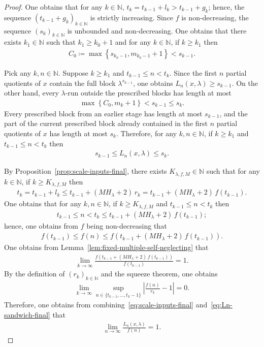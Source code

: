 \documentclass[12pt,reqno]{amsart}
\theoremstyle{definition}
\theoremstyle{plain}
\begin{document}
\begin{proof}
One obtains that for any $k\in\mathbb{N}$, $t_k=t_{k-1}+l_k>t_{k-1}+g_k$; hence, the sequence $(t_{k-1}+g_k)_{k\in\mathbb{N}}$ is strictly increasing. Since $f$ is non-decreasing, the sequence $(s_k)_{k\in\mathbb{N}}$ is unbounded and non-decreasing. One obtains that there exists $k_1\in\mathbb{N}$ such that $k_1\geq k_0+1$ and for any $k\in\mathbb{N}$, if $k\geq k_1$ then
\begin{align*}
    C_0\coloneqq\max{\left\{s_{k_0-1},m_{k_0-1}+1\right\}}<s_{k-1}.
\end{align*}

Pick any $k,n\in\mathbb{N}$. Suppose $k\geq k_1$ and $t_{k-1}\leq n< t_k$. Since the first $n$ partial quotients of $x$ contain the full block $\lambda^{s_{k-1}}$, one obtains $L_n(x,\lambda)\geq s_{k-1}$. On the other hand, every $\lambda$-run outside the prescribed blocks has length at most
\begin{align*}
    \max{\left\{C_0,m_k+1\right\}}<s_{k-1}\leq s_k.
\end{align*}
Every prescribed block from an earlier stage has length at most $s_{k-1}$, and the part of the current prescribed block already contained in the first $n$ partial quotients of $x$ has length at most $s_k$. Therefore, for any $k,n\in\mathbb{N}$, if $k\geq k_1$ and $t_{k-1}\leq n< t_k$ then
\begin{align}
    \label{eq:Ln-sandwich-final}
    s_{k-1}
    \leq L_n(x,\lambda)
    \leq s_k.
\end{align}

By Proposition~\ref{prop:scale-inputs-final}, there exists $K_{\lambda,f,M}\in\mathbb{N}$ such that for any $k\in\mathbb{N}$, if $k\geq K_{\lambda,f,M}$ then 
\begin{align*}
    t_k=t_{k-1}+l_k
    \leq t_{k-1}+(MH_\lambda+2)\,r_k
    =t_{k-1}+(MH_\lambda+2)\, f(t_{k-1}).
\end{align*}
One obtains that for any $k,n\in\mathbb{N}$, if $k\geq K_{\lambda,f,M}$ and $t_{k-1}\leq n< t_k$ then
\begin{align*}
    t_{k-1}\leq n< t_k\leq t_{k-1}+(MH_\lambda+2)\,f(t_{k-1});
\end{align*}
hence, one obtains from $f$ being non-decreasing that
\begin{align*}
    f(t_{k-1})
    \leq f(n)
    \leq f(t_{k-1}+(MH_\lambda+2)\,f(t_{k-1})).
\end{align*}
One obtains from Lemma~\ref{lem:fixed-multiple-self-neglecting} that
\begin{align*}
    \lim_{k\to\infty}\frac{f(t_{k-1}+(MH_\lambda+2)\,f(t_{k-1}))}{f(t_{k-1})}
    =1.
\end{align*}
By the definition of $(r_k)_{k\in\mathbb{N}}$ and the squeeze theorem, one obtains
\begin{align*}
    \lim_{k\to\infty}\sup_{n\in\{t_{k-1},\ldots,t_k-1\}}
    \left|\frac{f(n)}{r_k}-1\right|
    =0.
\end{align*}
Therefore, one obtains from combining~\eqref{eq:scale-inputs-final} and~\eqref{eq:Ln-sandwich-final} that
\begin{align*}
    \lim_{n\to\infty}\frac{L_n(x,\lambda)}{f(n)}=1.
\end{align*}


\end{proof}
\end{document}
